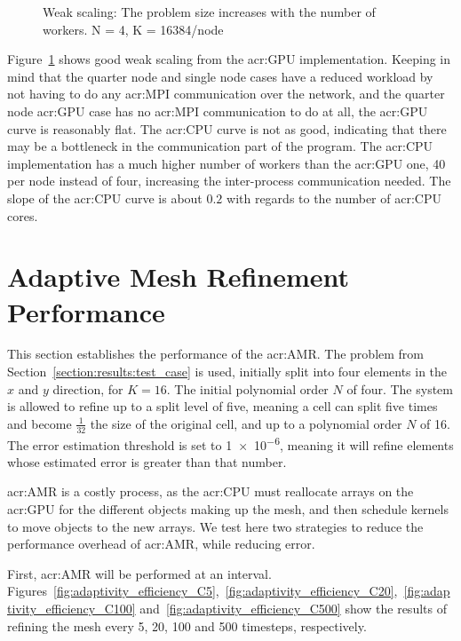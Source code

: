 \begin{figure}[H]
	\centering
	
	\caption{Weak scaling: The problem size increases with the number of workers. N = 4, K = 16384/node}\label{fig:weak_scaling}
\end{figure}

Figure~\ref{fig:weak_scaling} shows good weak scaling from the \acrshort{acr:GPU} implementation.
Keeping in mind that the quarter node and single node cases have a reduced workload by not having to
do any \acrshort{acr:MPI} communication over the network, and the quarter node \acrshort{acr:GPU}
case has no \acrshort{acr:MPI} communication to do at all, the \acrshort{acr:GPU} curve is
reasonably flat. The \acrshort{acr:CPU} curve is not as good, indicating that there may be a
bottleneck in the communication part of the program. The \acrshort{acr:CPU} implementation has a
much higher number of workers than the \acrshort{acr:GPU} one, 40 per node instead of four,
increasing the inter-process communication needed. The slope of the \acrshort{acr:CPU} curve is
about \(0.2\) with regards to the number of \acrshort{acr:CPU} cores. 

\section{Adaptive Mesh Refinement Performance}\label{section:results:adaptivity_performance}

This section establishes the performance of the \acrlong{acr:AMR}. The problem from
Section~\ref{section:results:test_case} is used, initially split into four elements in the \(x\) and
\(y\) direction, for \(K = 16\). The initial polynomial order \(N\) of four. The system is allowed
to refine up to a split level of five, meaning a cell can split five times and become \(
\frac{1}{32}\) the size of the original cell, and up to a polynomial order \(N\) of 16. The error
estimation threshold is set to \num{1e-6}, meaning it will refine elements whose estimated error is
greater than that number.

\Acrlong{acr:AMR} is a costly process, as the \acrshort{acr:CPU} must reallocate arrays on the
\acrshort{acr:GPU} for the different objects making up the mesh, and then schedule kernels to move
objects to the new arrays. We test here two strategies to reduce the performance overhead of
\acrlong{acr:AMR}, while reducing error. 

First, \acrlong{acr:AMR} will be performed at an interval.
Figures~\ref{fig:adaptivity_efficiency_C5},~\ref{fig:adaptivity_efficiency_C20},~\ref{fig:adaptivity_efficiency_C100}
and~\ref{fig:adaptivity_efficiency_C500} show the results of refining the mesh every 5, 20, 100 and
500 timesteps, respectively.

